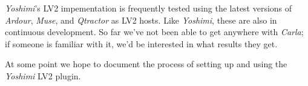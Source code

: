 %

   \textsl{Yoshimi}'s LV2 impementation is frequently tested using the latest
   versions of \textsl{Ardour}, \textsl{Muse}, and \textsl{Qtractor} as LV2
   hosts. Like \textsl{Yoshimi}, these are also in continuous development. So
   far we've not been able to get anywhere with \textsl{Carla}; if someone is
   familiar with it, we'd be interested in what results they get.

   At some point we hope to document the process of setting up and using
   the \textsl{Yoshimi} LV2 plugin.



